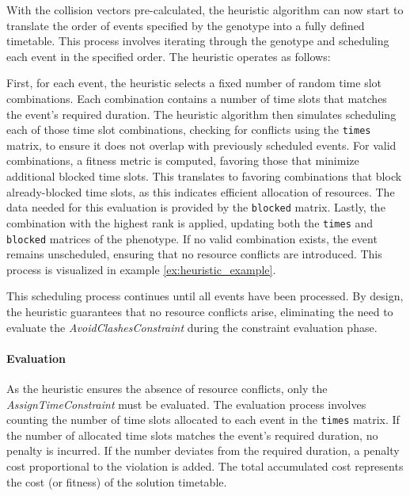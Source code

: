 \documentclass[english,examples]{isasthesis}
\begin{document}
With the collision vectors pre-calculated, the heuristic algorithm can now start
to translate the order of events specified by the genotype into a fully
defined timetable. This process involves iterating through the genotype and
scheduling each event in the specified order. The heuristic operates as follows:

First, for each event, the heuristic selects a fixed number of random time slot
combinations. Each combination contains a number of time slots that matches the
event's required duration.
The heuristic algorithm then simulates scheduling each of those time slot
combinations, checking for conflicts using the
\lstinline[language=Rust]|times| matrix, to ensure it does not overlap with
previously scheduled events.
%
For valid combinations, a fitness metric is
computed, favoring those that minimize additional blocked time slots.
This translates to favoring combinations that block already-blocked time slots,
as this indicates efficient allocation of resources.
%
The data needed for this evaluation is provided by the
\lstinline[language=Rust]|blocked| matrix.
Lastly, the combination with the highest rank is applied, updating both the
\lstinline[language=Rust]|times| and \lstinline[language=Rust]|blocked|
matrices of the phenotype. If no valid combination exists, the event remains
unscheduled, ensuring that no resource conflicts are introduced. This process
is visualized in example \ref{ex:heuristic_example}.

This scheduling process continues until all events have been processed. By
design, the heuristic guarantees that no resource conflicts arise, eliminating
the need to evaluate the \textit{AvoidClashesConstraint} during the
constraint evaluation phase.

\paragraph{Evaluation}
As the heuristic ensures the absence of resource conflicts, only the
\textit{AssignTimeConstraint} must be evaluated. The evaluation process
involves counting the number of time slots allocated to each event in the
\lstinline[language=Rust]|times| matrix. If the number of allocated time slots
matches the event's required duration, no penalty is incurred. If the number
deviates from the required duration, a penalty cost proportional to the
violation is added. The total accumulated cost represents the cost (or fitness)
of the solution timetable.
\end{document}

